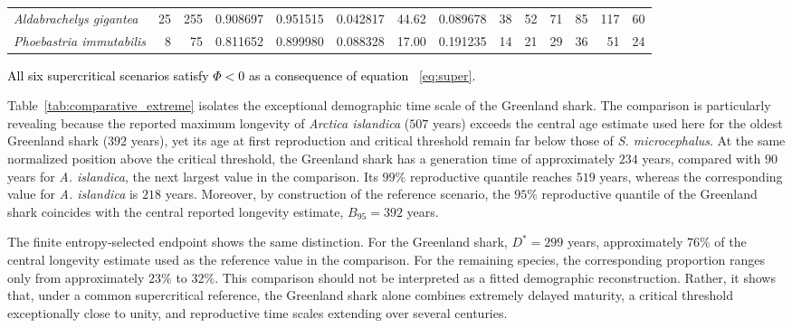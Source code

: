 \documentclass[11pt,a4paper]{amsart}
\begin{document}
\begin{table}[H]
{\begin{tabular}{lrrrrrrrrrrrrr}
			\textit{Aldabrachelys gigantea}
			\cite{Bourn1977Aldabra,Gerlach2004GiantTortoises}
			& 25 & 255 & 0.908697 & 0.951515 & 0.042817
			& 44.62 & 0.089678 & 38 & 52 & 71 & 85 & 117 & 60 \\
			
			\textit{Phoebastria immutabilis}
			\cite{Finkelstein2010LaysanAlbatross,USFWS2025Wisdom}
			& 8 & 75 & 0.811652 & 0.899980 & 0.088328
			& 17.00 & 0.191235 & 14 & 21 & 29 & 36 & 51 & 24 \\
			
			\bottomrule
		\end{tabular}%
	}
\end{table}
\FloatBarrier

\textcolor{black}{All six supercritical scenarios satisfy $\Phi<0$ as a consequence
of equation~ \eqref{eq:super}.}

Table~\ref{tab:comparative_extreme} isolates the exceptional demographic
time scale of the Greenland shark. The comparison is particularly revealing
because the reported maximum longevity of \textit{Arctica islandica}
(\(507\) years) exceeds the central age estimate used here for the oldest
Greenland shark (\(392\) years), yet its age at first reproduction and
critical threshold remain far below those of \textit{S. microcephalus}.
At the same normalized position above the critical threshold, the Greenland
shark has a generation time of approximately \(234\) years, compared with
\(90\) years for \textit{A. islandica}, the next largest value in the
comparison. Its \(99\%\) reproductive quantile reaches \(519\) years,
whereas the corresponding value for \textit{A. islandica} is \(218\) years.
Moreover, by construction of the reference scenario, the \(95\%\)
reproductive quantile of the Greenland shark coincides with the central
reported longevity estimate, \(B_{95}=392\) years.

The finite entropy-selected endpoint shows the same distinction. For the
Greenland shark, \(D^*=299\) years, approximately \(76\%\) of the central
longevity estimate used as the reference value in the comparison. For the
remaining species, the corresponding proportion ranges only from
approximately \(23\%\) to \(32\%\). This comparison should not be
interpreted as a fitted demographic reconstruction. Rather, it shows that,
under a common supercritical reference, the Greenland shark alone combines
extremely delayed maturity, a critical threshold exceptionally close to
unity, and reproductive time scales extending over several centuries.
\end{document}
